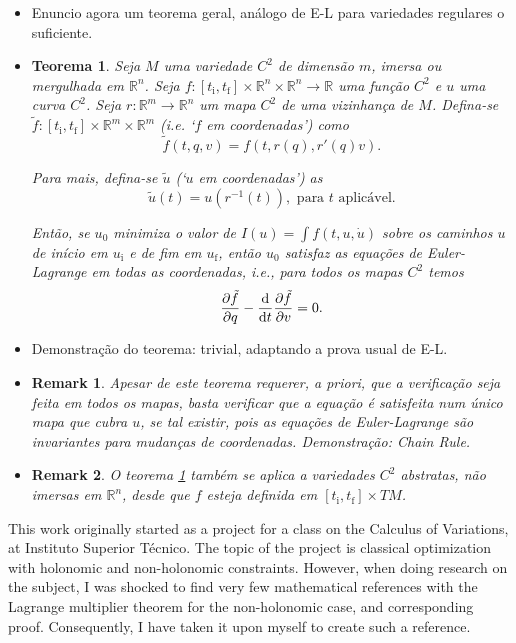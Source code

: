 \documentclass{article}
\theoremstyle{plain}
\newtheorem{theorem}{Teorema}
\theoremstyle{plain}
\newtheorem{remark}{Remark}
\theoremstyle{nonumberplain}
\theoremstyle{empty}
\newcommand{\R}{\mathbb{R}}
\newcommand{\tstart}{\mathrm{i}}
\newcommand{\tend}{\mathrm{f}}
\begin{document}
\begin{itemize}
\item Enuncio agora um teorema geral, análogo de E-L para variedades regulares o suficiente.

\item \begin{theorem}\label{elinmanifolds}
Seja $M$ uma variedade $C^2$ de dimensão $m$, imersa ou mergulhada em $\R^n$. Seja $f : [t_\tstart, t_\tend] \times \R^n \times \R^n \to \R$ uma função $C^2$ e $u$ uma curva $C^2$. Seja $r : \R^m \to \R^n$ um mapa $C^2$ de uma vizinhança de $M$. Defina-se $\tilde f : [t_\tstart, t_\tend] \times \R^m \times \R^m$ (i.e. `$f$ em coordenadas') como
\[ \tilde f(t, q, v) = f(t, r(q), r'(q)v).\]

Para mais, defina-se $\tilde u$ (`$u$ em coordenadas') as
\[\tilde u(t) = u(r^{-1}(t)), \text{ para $t$ aplicável.}\]

Então, se $u_0$ minimiza o valor de $I(u) = \int f(t,u,\dot u)$ sobre os caminhos $u$ de início em $u_\tstart$ e de fim em $u_\tend$, então $u_0$ satisfaz as equações de Euler-Lagrange em todas as coordenadas, i.e., para todos os mapas $C^2$ temos
\[\diffp{\tilde f} q - \diff*{\diffp{\tilde f}v}t = 0.\]
\end{theorem}

\item Demonstração do teorema: trivial, adaptando a prova usual de E-L.

\item \begin{remark}
Apesar de este teorema requerer, a priori, que a verificação seja feita em todos os mapas, basta verificar que a equação é satisfeita num único mapa que cubra $u$, se tal existir, pois as equações de Euler-Lagrange são invariantes para mudanças de coordenadas. Demonstração: Chain Rule.
\end{remark}

\item \begin{remark}
O teorema \ref{elinmanifolds} também se aplica a variedades $C^2$ abstratas, não imersas em $\R^n$, desde que $f$ esteja definida em $[t_\tstart, t_\tend] \times TM$.
\end{remark}
\end{itemize}

This work originally started as a project for a class on the Calculus of Variations, at Instituto Superior Técnico. The topic of the project is classical optimization with holonomic and non-holonomic constraints. However, when doing research on the subject, I was shocked to find very few mathematical references with the Lagrange multiplier theorem for the non-holonomic case, and corresponding proof. Consequently, I have taken it upon myself to create such a reference.
\end{document}
